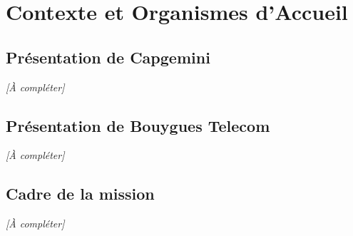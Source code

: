 \chapter{Contexte et Organismes d'Accueil}

\section{Présentation de Capgemini}
\textit{[À compléter]}

\section{Présentation de Bouygues Telecom}
\textit{[À compléter]}

\section{Cadre de la mission}
\textit{[À compléter]}

\newpage
